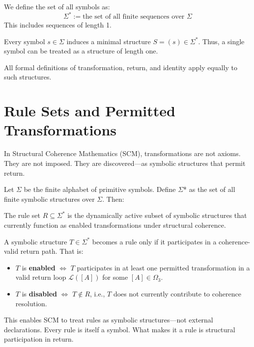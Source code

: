 We define the set of all symbols as:
\begin{equation} \label{eq:all_symbolic-structures}
\Sigma^* := \text{the set of all finite sequences over } \Sigma
\end{equation}
This includes sequences of length 1.

Every symbol $s \in \Sigma$ induces a minimal structure $S = (s) \in \Sigma^*$.  
Thus, a single symbol can be treated as a structure of length one.

All formal definitions of transformation, return, and identity apply equally to such structures.

\section{Rule Sets and Permitted Transformations}

In Structural Coherence Mathematics (SCM), transformations are not axioms. They are not imposed. They are discovered---as symbolic structures that permit return.

Let $\Sigma$ be the finite alphabet of primitive symbols. Define $\Sigma$* as the set of all finite symbolic structures over $\Sigma$. Then:

\begin{definition} \label{def:rule-set-r}
The rule set $R \subseteq \Sigma^*$ is the dynamically active subset of symbolic structures that currently function as enabled transformations under structural coherence.
\end{definition}

\begin{definition} \label{def:enabled-vs-disabled-rules}
A symbolic structure $T \in \Sigma^*$ becomes a rule only if it participates in a coherence-valid return path. That is:
\begin{itemize}
  \item $T$ is \textbf{enabled} $\iff$ $T$ participates in at least one permitted transformation in a valid return loop $\mathcal{L}([A])$ for some $[A] \in \Omega_3$.
  \item $T$ is \textbf{disabled} $\iff$ $T \notin R$, i.e., $T$ does not currently contribute to coherence resolution.
\end{itemize}
\end{definition}

This enables SCM to treat rules as symbolic structures---not external declarations. Every rule is itself a symbol. What makes it a rule is structural participation in return.

